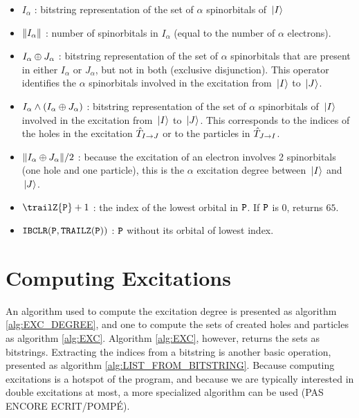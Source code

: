 \documentclass[./thesis.tex]{subfiles}
\begin{document}
\begin{itemize}
	      
	\item $I_{\alpha}$ : bitstring representation of the set of $\alpha$ spinorbitals of ${\ket*{I}}$
	            
	\item $\norm{I_{\alpha}}$ : number of spinorbitals in $I_{\alpha}$ (equal to the number of $\alpha$ electrons).
	            
	\item $I_{\alpha} \oplus J_{\alpha}$ : bitstring representation of the set of $\alpha$ spinorbitals that are present in either $I_{\alpha}$ or $J_{\alpha}$, but not in both (exclusive disjunction).
        This operator identifies the $\alpha$ spinorbitals involved in the excitation from ${\ket*{I}}$ to ${\ket*{J}}$. 
	            
	\item $I_{\alpha} \wedge \qty(I_{\alpha} \oplus J_{\alpha})$ : 
        bitstring representation of the set of $\alpha$ spinorbitals of ${\ket*{I}}$ involved in the excitation from ${\ket*{I}}$ to ${\ket*{J}}$. This corresponds to the indices of the holes in the excitation ${\hat{T}_{I \rightarrow J}}$ or to the particles in ${\hat{T}_{J \rightarrow I}}$. 
	            
	\item $\norm{I_{\alpha} \oplus J_{\alpha}}/2$ : because the excitation of an electron involves 2 spinorbitals (one hole and one particle), this is the $\alpha$ excitation degree between ${\ket*{I}}$ and ${\ket*{J}}$.
	            
	\item $\trailZ{\bit{P}}+1$ : the index of the lowest orbital in ${\texttt{P}}$. If ${\texttt{P}}$ is $0$, returns $65$.
	            
	\item $\text{\texttt{IBCLR}}({\texttt{P}},\text{\texttt{TRAILZ}}({\texttt{P}}))$ : ${\texttt{P}}$ without its orbital of lowest index.

\end{itemize}


\section{Computing Excitations}

An algorithm used to compute the excitation degree is presented as algorithm \ref{alg:EXC_DEGREE}, and one to compute the sets of created holes and particles as algorithm \ref{alg:EXC}. Algorithm \ref{alg:EXC}, however, returns the sets as bitstrings. Extracting the indices from a bitstring is another basic operation, presented as algorithm \ref{alg:LIST_FROM_BITSTRING}.
Because computing excitations is a hotspot of the program, and because we are typically interested in double excitations at most, a more specialized algorithm can be used (\alert{PAS ENCORE ECRIT/POMPÉ}).
\end{document}
